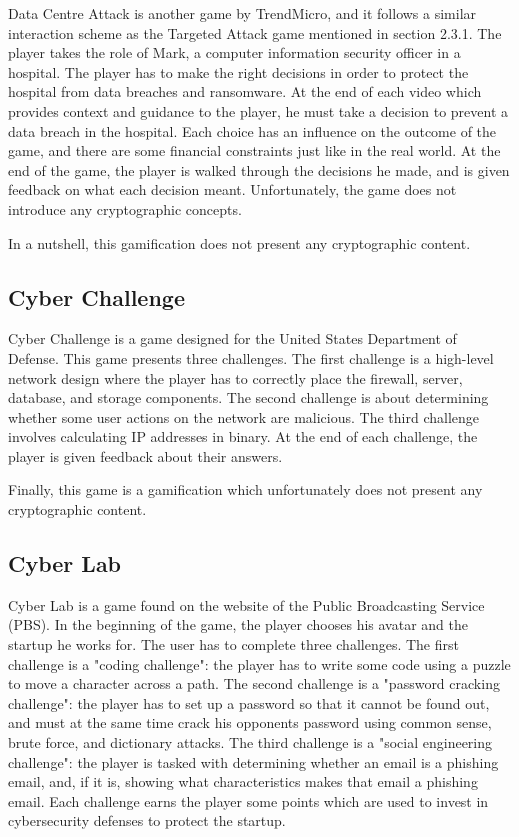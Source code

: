 \documentclass{l4proj}
\begin{document}
Data Centre Attack is another game by TrendMicro, and it follows a similar interaction scheme as the Targeted Attack game mentioned in section 2.3.1.
The player takes the role of Mark, a computer information security officer in a hospital. 
The player has to make the right decisions in order to protect the hospital from data breaches and ransomware.
At the end of each video which provides context and guidance to the player, he must take a decision to prevent a data breach in the hospital.
Each choice has an influence on the outcome of the game, and there are some financial constraints just like in the real world.
At the end of the game, the player is walked through the decisions he made, and is given feedback on what each decision meant.
Unfortunately, the game does not introduce any cryptographic concepts.

In a nutshell, this gamification does not present any cryptographic content.

\subsection{Cyber Challenge}

Cyber Challenge is a game designed for the United States Department of Defense. This game presents three challenges.
The first challenge is a high-level network design where the player has to correctly place the firewall, server, database, and storage components.
The second challenge is about determining whether some user actions on the network are malicious.
The third challenge involves calculating IP addresses in binary. 
At the end of each challenge, the player is given feedback about their answers.

Finally, this game is a gamification which unfortunately does not present any cryptographic content.


\subsection{Cyber Lab}

Cyber Lab is a game found on the website of the Public Broadcasting Service (PBS). 
In the beginning of the game, the player chooses his avatar and the startup he works for.
The user has to complete three challenges. 
The first challenge is a "coding challenge": the player has to write some code using a puzzle to move a character across a path.
The second challenge is a "password cracking challenge": the player has to set up a password so that it cannot be found out, 
and must at the same time crack his opponents password using common sense, brute force, and dictionary attacks.
The third challenge is a "social engineering challenge": the player is tasked with determining whether an email is a phishing email, 
and, if it is, showing what characteristics makes that email a phishing email.
Each challenge earns the player some points which are used to invest in cybersecurity defenses to protect the startup.
\end{document}
